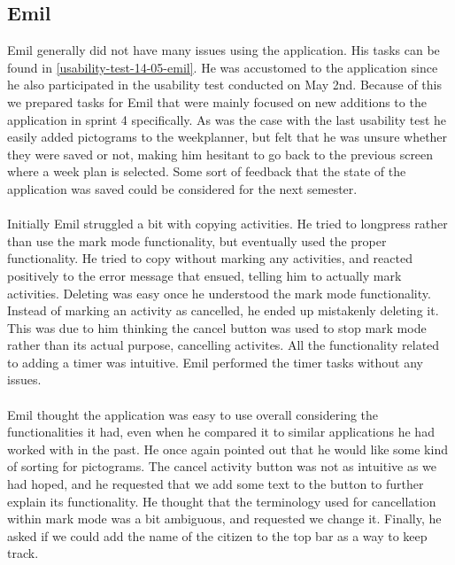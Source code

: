 \subsection{Emil}
Emil generally did not have many issues using the application. 
His tasks can be found in \autoref{usability-test-14-05-emil}.
He was accustomed to the application since he also participated in the usability test conducted on May 2nd. 
Because of this we prepared tasks for Emil that were mainly focused on new additions to the application in sprint 4 specifically.
As was the case with the last usability test he easily added pictograms to the weekplanner, but felt that he was unsure whether they were saved or not, making him hesitant to go back to the previous screen where a week plan is selected. 
Some sort of feedback that the state of the application was saved could be considered for the next semester.
\\\\
Initially Emil struggled a bit with copying activities.
He tried to longpress rather than use the mark mode functionality, but eventually used the proper functionality.
He tried to copy without marking any activities, and reacted positively to the error message that ensued, telling him to actually mark activities.
Deleting was easy once he understood the mark mode functionality.
Instead of marking an activity as cancelled, he ended up mistakenly deleting it.
This was due to him thinking the cancel button was used to stop mark mode rather than its actual purpose, cancelling activites.
All the functionality related to adding a timer was intuitive. 
Emil performed the timer tasks without any issues.
\\\\
Emil thought the application was easy to use overall considering the functionalities it had, even when he compared it to similar applications he had worked with in the past.
He once again pointed out that he would like some kind of sorting for pictograms.
The cancel activity button was not as intuitive as we had hoped, and he requested that we add some text to the button to further explain its functionality.
He thought that the terminology used for cancellation within mark mode was a bit ambiguous, and requested we change it.
Finally, he asked if we could add the name of the citizen to the top bar as a way to keep track.

